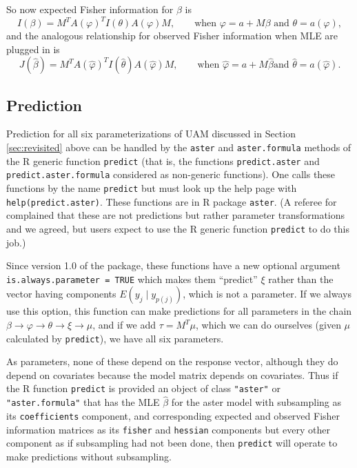 So now expected Fisher information for $\beta$ is
$$
   I(\beta) = M^T A(\varphi)^T I(\theta) A(\varphi) M,
   \qquad \text{when $\varphi = a + M \beta$ and $\theta = a(\varphi)$},
$$
and the analogous relationship for observed Fisher information
when MLE are plugged in is
$$
   J(\hat{\beta})
   =
   M^T A(\hat{\varphi})^T I(\hat{\theta}) A(\hat{\varphi}) M,
   \qquad \text{when $\hat{\varphi} = a + M \hat{\beta}$
   and $\hat{\theta} = a(\hat{\varphi})$}.
$$

\subsection{Prediction}
\label{sec:predict}

Prediction for all six parameterizations of UAM discussed in
Section \ref{sec:revisited} above can be handled by the \texttt{aster}
and \texttt{aster.formula} methods of the R generic function \texttt{predict}
(that is, the functions \texttt{predict.aster}
and \texttt{predict.aster.formula} considered as non-generic functions).
One calls these functions by the name \texttt{predict} but must look up the
help page with \texttt{help(predict.aster)}.
These functions are in R package \texttt{aster}.
(A referee for \citet{aster1} complained that these are not predictions
but rather parameter transformations and we agreed, but users expect to use
the R generic function \texttt{predict} to do this job.)

Since version 1.0 of the package, these functions have a new optional argument
\texttt{is.always.parameter = TRUE} which makes them ``predict'' $\xi$
rather than the vector having components $E(y_j \mid y_{p(j)})$, which
is not a parameter.
If we always use this option, this function can make predictions for all
parameters in the chain $\beta \to \varphi \to \theta \to \xi \to \mu$,
and if we add $\tau = M^T \mu$, which we can do ourselves (given $\mu$
calculated by \texttt{predict}), we have all six parameters.

As parameters, none of these depend on the response vector, although they
do depend on covariates because the model matrix depends on covariates.
Thus if the R function \texttt{predict} is provided an object of class
\texttt{"aster"} or \texttt{"aster.formula"}
that has the MLE $\hat{\beta}$ for the aster model with subsampling
as its \texttt{coefficients} component, and corresponding expected and observed
Fisher information matrices as its \texttt{fisher} and \texttt{hessian}
components but every other component as if subsampling had not been done,
then \texttt{predict} will operate to make predictions without subsampling.

